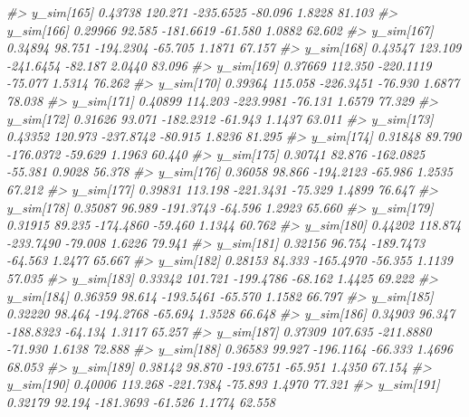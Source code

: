 \documentclass[
  10pt,
  italian,
  a4paper,
  extrafontsizes,onecolumn,openright
  ]{memoir}
\newenvironment{Shaded}{\begin{snugshade}}{\end{snugshade}}
\newcommand{\CommentTok}[1]{\textcolor[rgb]{0.56,0.35,0.01}{\textit{#1}}}
\begin{document}
\begin{Shaded}
\begin{Highlighting}[]
\CommentTok{\#\textgreater{}   y\_sim[165]  0.43738 120.271 {-}235.6525 {-}80.096  1.8228 81.103}
\CommentTok{\#\textgreater{}   y\_sim[166]  0.29966  92.585 {-}181.6619 {-}61.580  1.0882 62.602}
\CommentTok{\#\textgreater{}   y\_sim[167]  0.34894  98.751 {-}194.2304 {-}65.705  1.1871 67.157}
\CommentTok{\#\textgreater{}   y\_sim[168]  0.43547 123.109 {-}241.6454 {-}82.187  2.0440 83.096}
\CommentTok{\#\textgreater{}   y\_sim[169]  0.37669 112.350 {-}220.1119 {-}75.077  1.5314 76.262}
\CommentTok{\#\textgreater{}   y\_sim[170]  0.39364 115.058 {-}226.3451 {-}76.930  1.6877 78.038}
\CommentTok{\#\textgreater{}   y\_sim[171]  0.40899 114.203 {-}223.9981 {-}76.131  1.6579 77.329}
\CommentTok{\#\textgreater{}   y\_sim[172]  0.31626  93.071 {-}182.2312 {-}61.943  1.1437 63.011}
\CommentTok{\#\textgreater{}   y\_sim[173]  0.43352 120.973 {-}237.8742 {-}80.915  1.8236 81.295}
\CommentTok{\#\textgreater{}   y\_sim[174]  0.31848  89.790 {-}176.0372 {-}59.629  1.1963 60.440}
\CommentTok{\#\textgreater{}   y\_sim[175]  0.30741  82.876 {-}162.0825 {-}55.381  0.9028 56.378}
\CommentTok{\#\textgreater{}   y\_sim[176]  0.36058  98.866 {-}194.2123 {-}65.986  1.2535 67.212}
\CommentTok{\#\textgreater{}   y\_sim[177]  0.39831 113.198 {-}221.3431 {-}75.329  1.4899 76.647}
\CommentTok{\#\textgreater{}   y\_sim[178]  0.35087  96.989 {-}191.3743 {-}64.596  1.2923 65.660}
\CommentTok{\#\textgreater{}   y\_sim[179]  0.31915  89.235 {-}174.4860 {-}59.460  1.1344 60.762}
\CommentTok{\#\textgreater{}   y\_sim[180]  0.44202 118.874 {-}233.7490 {-}79.008  1.6226 79.941}
\CommentTok{\#\textgreater{}   y\_sim[181]  0.32156  96.754 {-}189.7473 {-}64.563  1.2477 65.667}
\CommentTok{\#\textgreater{}   y\_sim[182]  0.28153  84.333 {-}165.4970 {-}56.355  1.1139 57.035}
\CommentTok{\#\textgreater{}   y\_sim[183]  0.33342 101.721 {-}199.4786 {-}68.162  1.4425 69.222}
\CommentTok{\#\textgreater{}   y\_sim[184]  0.36359  98.614 {-}193.5461 {-}65.570  1.1582 66.797}
\CommentTok{\#\textgreater{}   y\_sim[185]  0.32220  98.464 {-}194.2768 {-}65.694  1.3528 66.648}
\CommentTok{\#\textgreater{}   y\_sim[186]  0.34903  96.347 {-}188.8323 {-}64.134  1.3117 65.257}
\CommentTok{\#\textgreater{}   y\_sim[187]  0.37309 107.635 {-}211.8880 {-}71.930  1.6138 72.888}
\CommentTok{\#\textgreater{}   y\_sim[188]  0.36583  99.927 {-}196.1164 {-}66.333  1.4696 68.053}
\CommentTok{\#\textgreater{}   y\_sim[189]  0.38142  98.870 {-}193.6751 {-}65.951  1.4350 67.154}
\CommentTok{\#\textgreater{}   y\_sim[190]  0.40006 113.268 {-}221.7384 {-}75.893  1.4970 77.321}
\CommentTok{\#\textgreater{}   y\_sim[191]  0.32179  92.194 {-}181.3693 {-}61.526  1.1774 62.558}

\end{Highlighting}
\end{Shaded}
\end{document}
